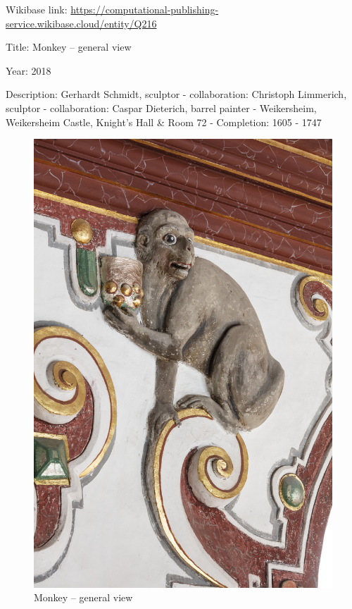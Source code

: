 \documentclass[
  letterpaper,
]{book}
\begin{document}
Wikibase link:
\url{https://computational-publishing-service.wikibase.cloud/entity/Q216}

Title: Monkey -- general view

Year: 2018

Description: Gerhardt Schmidt, sculptor - collaboration: Christoph
Limmerich, sculptor - collaboration: Caspar Dieterich, barrel painter -
Weikersheim, Weikersheim Castle, Knight's Hall \& Room 72 - Completion:
1605 - 1747

\begin{figure}[H]

{\centering \includegraphics{impressum_files/mediabag/fmd10005867a.jpg}

}

\caption{Monkey -- general view}

\end{figure}%
\end{document}
